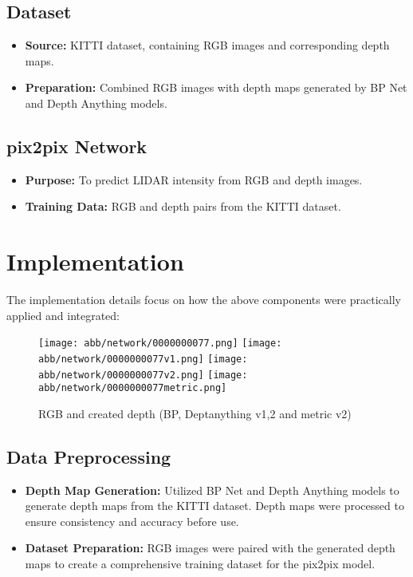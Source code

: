 \subsection{Dataset}
\begin{itemize}
	\item \textbf{Source:} KITTI dataset, containing RGB images and corresponding depth maps.
	\item \textbf{Preparation:} Combined RGB images with depth maps generated by BP Net and Depth Anything models.
\end{itemize}

\subsection{pix2pix Network}
\begin{itemize}
	\item \textbf{Purpose:} To predict LIDAR intensity from RGB and depth images.
	\item \textbf{Training Data:} RGB and depth pairs from the KITTI dataset.
\end{itemize}

\section{Implementation}
The implementation details focus on how the above components were practically applied and integrated:
\begin{figure}[!ht]
	\centering
	\texttt{[image: abb/network/0000000077.png]}
	\texttt{[image: abb/network/0000000077v1.png]}
	\texttt{[image: abb/network/0000000077v2.png]}
	\texttt{[image: abb/network/0000000077metric.png]}
	\caption{RGB and created depth (BP, Deptanything v1,2 and metric v2)}
	\label{rgb_depths}
\end{figure}
\subsection{Data Preprocessing}
\begin{itemize}
	\item \textbf{Depth Map Generation:} Utilized BP Net and Depth Anything models to generate depth maps from the KITTI dataset. Depth maps were processed to ensure consistency and accuracy before use.
	\item \textbf{Dataset Preparation:} RGB images were paired with the generated depth maps to create a comprehensive training dataset for the pix2pix model.
\end{itemize}

